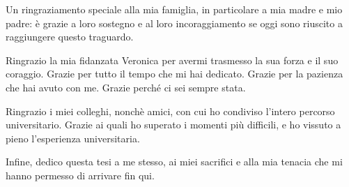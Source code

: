 \documentclass[corpo=11pt,numerazioneromana]{toptesi}
\begin{document}



\frontmatter







\ringraziamenti
Un ringraziamento speciale alla mia famiglia, in particolare a mia madre e mio padre: è grazie a loro sostegno e al loro incoraggiamento se oggi sono riuscito a raggiungere questo traguardo.

Ringrazio la mia fidanzata Veronica per avermi trasmesso la sua forza e il suo coraggio. Grazie per tutto il tempo che mi hai dedicato. Grazie per la pazienza che hai avuto con me. Grazie perché ci sei sempre stata. 


Ringrazio i miei colleghi, nonchè amici, con cui ho condiviso l’intero percorso universitario. Grazie ai quali ho superato i momenti più difficili, e ho vissuto a pieno l'esperienza universitaria.


Infine, dedico questa tesi a me stesso, ai miei sacrifici e alla mia tenacia che mi hanno permesso di arrivare fin qui.




\end{document}
